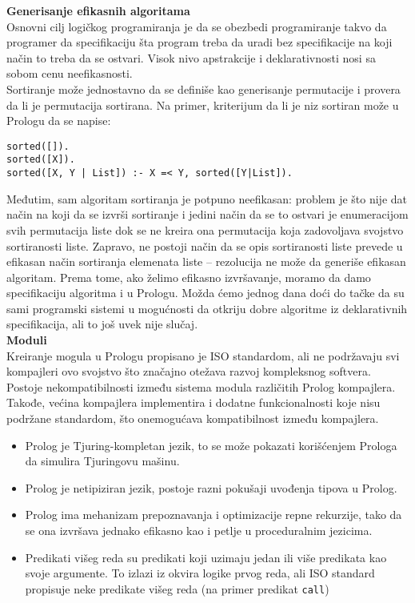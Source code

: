 \documentclass[../main.tex]{subfiles}
\begin{document}
{\bf Generisanje efikasnih algoritama}\\
Osnovni cilj logičkog programiranja je da se obezbedi programiranje takvo da programer da specifikaciju šta program treba da uradi bez specifikacije na koji način to treba da se ostvari. Visok nivo apstrakcije i deklarativnosti nosi sa sobom cenu neefikasnosti. 
\\
Sortiranje može jednostavno da se definiše kao generisanje permutacije i provera da li je permutacija sortirana. Na primer, kriterijum da li je niz sortiran može u Prologu da se napise:
\begin{Verbatim}
sorted([]).
sorted([X]).
sorted([X, Y | List]) :- X =< Y, sorted([Y|List]).
\end{Verbatim}
Međutim, sam algoritam sortiranja je potpuno neefikasan: problem je što nije dat način na koji da se izvrši sortiranje i jedini način da se to ostvari je enumeracijom svih permutacija liste dok se ne kreira ona permutacija koja zadovoljava svojstvo sortiranosti liste. Zapravo, ne postoji način da se opis sortiranosti liste prevede u efikasan način sortiranja elemenata liste -- rezolucija ne može da generiše efikasan algoritam. Prema tome, ako želimo efikasno izvršavanje, moramo da damo specifikaciju algoritma i u Prologu. Možda ćemo jednog dana doći do tačke da su sami programski sistemi u mogućnosti da otkriju dobre algoritme iz deklarativnih specifikacija, ali to još uvek nije slučaj.
\\
{\bf Moduli}\\
Kreiranje mogula u Prologu propisano je ISO standardom, ali ne podržavaju svi kompajleri ovo svojstvo što značajno otežava razvoj kompleksnog softvera. Postoje nekompatibilnosti između sistema modula različitih Prolog kompajlera. Takođe, većina kompajlera implementira i dodatne funkcionalnosti koje nisu podržane standardom, što onemogućava kompatibilnost između kompajlera.
\begin{itemize}
\item Prolog je Tjuring-kompletan jezik, to se može pokazati korišćenjem Prologa da simulira Tjuringovu mašinu.
\item Prolog je netipiziran jezik, postoje razni pokušaji uvođenja tipova u Prolog.
\item Prolog ima mehanizam prepoznavanja i optimizacije repne rekurzije, tako da se ona izvršava jednako efikasno kao i petlje u proceduralnim jezicima.
\item Predikati višeg reda su predikati koji uzimaju jedan ili više predikata kao svoje argumente. To izlazi iz okvira logike prvog reda, ali ISO standard propisuje neke predikate višeg reda (na primer predikat \texttt{call})
\end{itemize}
\end{document}
